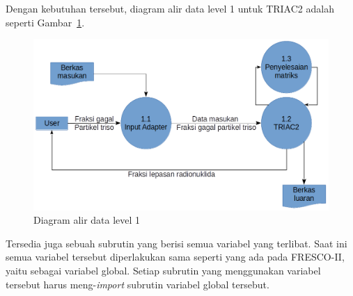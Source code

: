 \documentclass[a4paper,11pt]{report}
\newcommand{\putpdf}[1]{}
\renewcommand{\figurename}{Gambar}
\begin{document}
Dengan kebutuhan tersebut, diagram alir data level 1 untuk TRIAC2 adalah seperti \figurename~\ref{fig:level1triac2}.
\begin{figure}
  \begin{center}
    \includegraphics[scale=.35]{pics/level1triac2.png}
    \caption{Diagram alir data level 1}
    \label{fig:level1triac2}
  \end{center}
\end{figure}

Tersedia juga sebuah subrutin yang berisi semua variabel yang terlibat. Saat ini semua variabel tersebut diperlakukan sama seperti yang ada pada FRESCO-II, yaitu sebagai variabel global. Setiap subrutin yang menggunakan variabel tersebut harus meng-\textit{import} subrutin variabel global tersebut.



%	
%	
\end{document}
